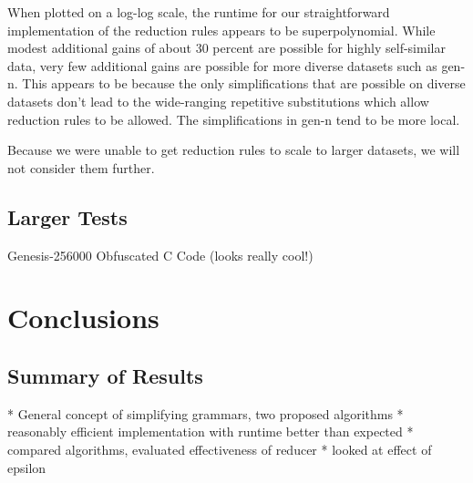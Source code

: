 \documentclass[11pt]{article}
\begin{document}
\begin{table}[p]
\caption{Reducer Tests for $\epsilon = .2$}
\end{table}


When plotted on a log-log scale, the runtime for our straightforward 
implementation of the reduction
rules appears to be superpolynomial. While modest additional gains of about 30 percent
are possible for highly self-similar data, very few additional gains are
possible for more diverse datasets such as gen-n. This appears to be because
the only simplifications that are possible on diverse datasets don't lead to
the wide-ranging repetitive substitutions which allow reduction rules to be allowed.
The simplifications in gen-n tend to be more local.

Because we were unable to get reduction rules to scale to larger datasets,
we will not consider them further.


\subsection{Larger Tests}
Genesis-256000
Obfuscated C Code (looks really cool!)

\section{Conclusions}
\subsection{Summary of Results}
* General concept of simplifying grammars, two proposed algorithms
* reasonably efficient implementation with runtime better than expected
* compared algorithms, evaluated effectiveness of reducer
* looked at effect of epsilon
\end{document}
